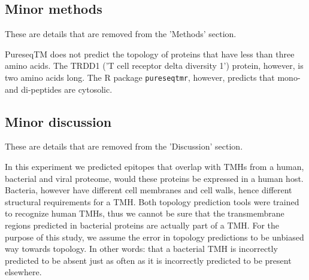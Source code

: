 

\clearpage

\subsection{Minor methods}

These are details that are removed from the 'Methods' section.

PureseqTM does not predict the topology
of proteins that have less than three amino acids. 
The TRDD1 ('T cell receptor delta diversity 1') protein,
however, is two amino acids long. 
The R package \verb;pureseqtmr;, however, 
predicts that mono- and di-peptides are cytosolic. 

\subsection{Minor discussion}

These are details that are removed from the 'Discussion' section.


In this experiment we predicted epitopes that overlap with 
TMHs from a human, bacterial and viral proteome,
would these proteins be expressed in a human host.
Bacteria, however have different cell membranes and cell walls, 
hence different structural requirements for a TMH.
Both topology prediction tools were trained to recognize
human TMHs, thus we cannot be sure that
the transmembrane regions predicted in bacterial proteins
are actually part of a TMH.
For the purpose of this study, we assume the 
error in topology predictions to be unbiased way towards topology.
In other words: that a bacterial TMH is incorrectly
predicted to be absent just as often as it is incorrectly
predicted to be present elsewhere.


